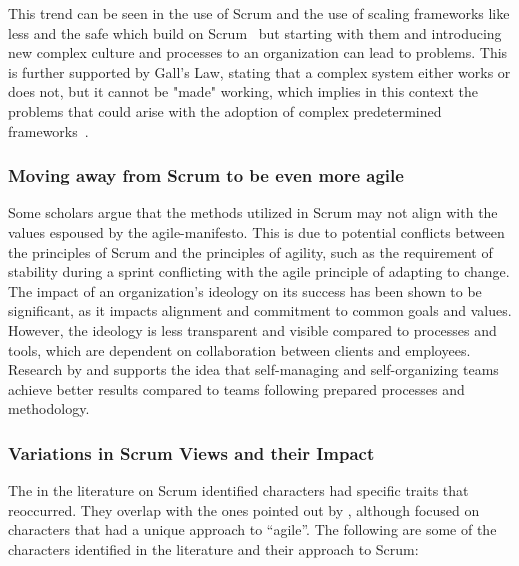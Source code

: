 This trend can be seen in the use of Scrum and the use of scaling \glspl{framework} like \ac{less} and the \ac{safe} which build on Scrum~\cite[p.~2]{Flynn20221AS} but starting with them and introducing new complex culture and processes to an organization can lead to problems. This is further supported by Gall's Law, stating that a complex system either works or does not, but it cannot be "made" working, which implies in this context the problems that could arise with the adoption of complex predetermined \glspl{framework}~\cite[p.~119]{Gall1986SHs}.

\subsubsection*{Moving away from Scrum to be even more agile}\label{subsec:MovingAwayFromScrum}
Some scholars argue that the \glspl{method} utilized in Scrum may not align with the values espoused by the \ac{agile-manifesto}. This is due to potential conflicts between the \glspl{principle} of Scrum and the \glspl{principle} of agility, such as the requirement of stability during a sprint conflicting with the \gls{agile} \gls{principle} of adapting to change. The impact of an organization's \gls{ideology} on its success has been shown to be significant, as it impacts alignment and \gls{commitment} to common goals and values. However, the \gls{ideology} is less transparent and visible compared to processes and tools, which are dependent on collaboration between \glspl{client} and employees. Research by  and  supports the idea that \gls{self-managing} and \gls{self-organizing} teams achieve better results compared to teams following prepared processes and \gls{methodology}.

\subsubsection*{Variations in Scrum Views and their Impact}\label{subsubsec:VariationsInScrumViews}
The in the literature on Scrum identified characters had specific traits that reoccurred. They overlap with the ones pointed out by , although \citeauthor{Moreira2013AtA} focused on characters that had a unique approach to “\Gls{agile}”. The following are some of the characters identified in the literature and their approach to Scrum:

